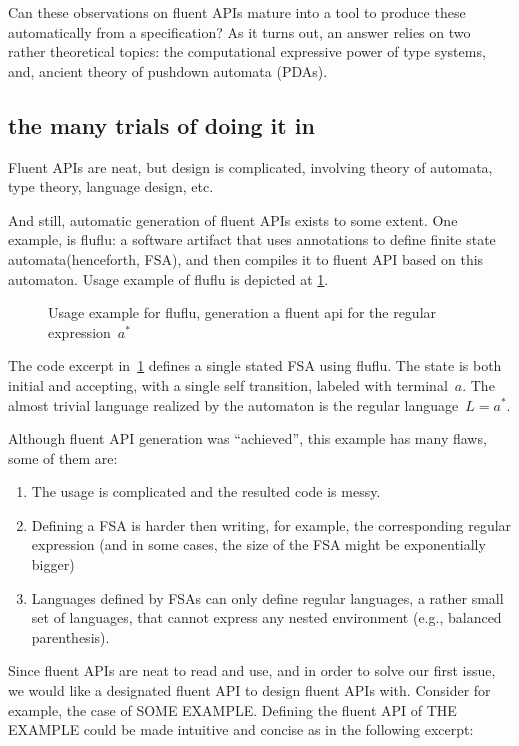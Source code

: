 Can these observations on fluent APIs mature into
  a tool to produce these automatically from a specification?
As it turns out, an answer relies on
  two rather theoretical topics:
  the computational expressive power of type systems,
  and, ancient theory of pushdown automata (PDAs).

\subsection{the many trials of doing it in \Java}
Fluent APIs are neat, but design is complicated,
involving theory of automata, type theory, language design, etc.

And still, automatic generation of fluent APIs exists to some extent.
One example, is fluflu: a software artifact that uses
\Java annotations to define finite state automata(henceforth, FSA), and then compiles it to
fluent API based on this automaton. 
Usage example of fluflu is depicted at \cref{figure:fluflu}. 

\begin{figure}
  \caption{\label{figure:fluflu}
    Usage example for fluflu, generation a fluent
    api for the regular expression~$a^*$}
\end{figure}
  
The code excerpt in~\cref{figure:fluflu} defines a single stated FSA using fluflu.
The state is both initial and accepting, with a single self transition, labeled
with terminal~$a$. The almost trivial language realized by the automaton is the
regular language~$L=a^*$.

Although fluent API generation was ``achieved'', this example has many flaws, some of them are:

\begin{enumerate}
  \item The usage is complicated and the resulted code is messy.
  \item Defining a FSA is harder then writing, for example, the corresponding regular
    expression (and in some cases, the size of the FSA might be exponentially bigger)
  \item Languages defined by FSAs can only define regular languages, a rather small
    set of languages, that cannot express any nested environment (e.g., balanced parenthesis).
\end{enumerate}

Since fluent APIs are neat to read and use, 
 and in order to solve our first issue, we would like a designated fluent API
 to design fluent APIs with.
Consider for example, the case of SOME EXAMPLE.
Defining the fluent API of THE EXAMPLE could be made intuitive and concise 
  as in the following excerpt:

